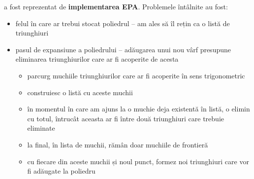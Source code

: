 \documentclass[12pt,a4paper]{report}
\providecommand{\DIFaddtex}[1]{{\protect\color{blue}\uwave{#1}}} %
\providecommand{\DIFaddend}{} %
\providecommand{\DIFadd}[1]{\texorpdfstring{\DIFaddtex{#1}}{#1}} %
\DeclareRobustCommand{\DIFaddend}{\DIFOaddend \let\includegraphics\DIFOincludegraphics} %
\begin{document}
	\DIFadd{Un alt impediment }\DIFaddend a fost reprezentat de \textbf{implementarea EPA}. Problemele întâlnite au fost:
	\begin{itemize}
		\item felul în care ar trebui stocat poliedrul -- am ales să îl rețin ca o listă de triunghiuri
		\item pasul de expansiune a poliedrului -- adăugarea unui nou vârf presupune eliminarea  triunghiurilor care ar fi acoperite de acesta
		\begin{itemize}
			\item parcurg muchiile triunghiurilor care ar fi acoperite în sens trigonometric
			\item construiesc o listă cu aceste muchii
			\item în momentul în care am ajuns la o muchie deja existentă în listă, o elimin cu totul, întrucât aceasta ar fi între două triunghiuri care trebuie eliminate
			\item la final, în lista de muchii, rămân doar muchiile de frontieră
			\item cu fiecare din aceste muchii și noul punct, formez noi triunghiuri care vor fi adăugate la poliedru
		\end{itemize}
	\end{itemize}
	
\end{document}
